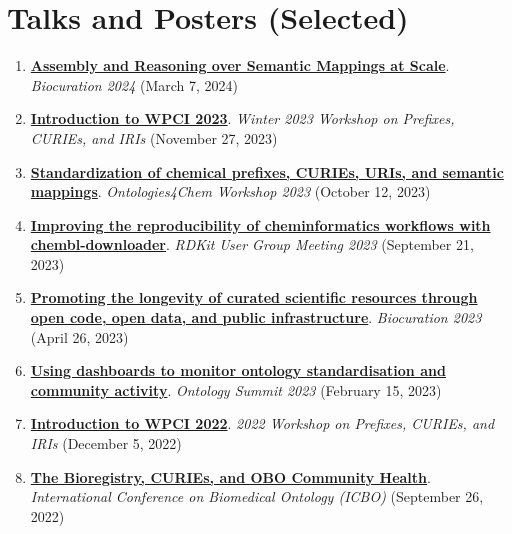 \documentclass[10pt,a4paper,sans]{moderncv} %
\begin{document}
\section{Talks and Posters (Selected)}
\begin{enumerate}
\itemsep0.5em
    \item \textbf{\href{https://bit.ly/biocuration2024-cth}{Assembly and Reasoning over Semantic Mappings at Scale}}. \textit{Biocuration 2024} (March 7, 2024)

    \item \textbf{\href{https://docs.google.com/presentation/d/1SJ-gyoctyX-WLkkULRkUDF25l5CmtZZG3xlWBegDRa8/edit?usp=sharing}{Introduction to WPCI 2023}}. \textit{Winter 2023 Workshop on Prefixes, CURIEs, and IRIs} (November 27, 2023)

    \item \textbf{\href{https://bit.ly/ontologies4chem2023-cth}{Standardization of chemical prefixes, CURIEs, URIs, and semantic mappings}}. \textit{Ontologies4Chem Workshop 2023} (October 12, 2023)

    \item \textbf{\href{https://bit.ly/cth-rdkit-ugm-2023}{Improving the reproducibility of cheminformatics workflows with chembl-downloader}}. \textit{RDKit User Group Meeting 2023} (September 21, 2023)

    \item \textbf{\href{https://docs.google.com/presentation/d/1hEryoMNyp8gwt2pvPy2ErKaw_QPvnWOmzPT0Sn4Yl4s/edit?usp=sharing}{Promoting the longevity of curated scientific resources through open code, open data, and public infrastructure}}. \textit{Biocuration 2023} (April 26, 2023)

    \item \textbf{\href{https://docs.google.com/presentation/d/1oKxBzSCZGuFlIhw6jAXw00xgEGs7KgmaVR54NEdPprw/edit?usp=sharing}{Using dashboards to monitor ontology standardisation and community activity}}. \textit{Ontology Summit 2023} (February 15, 2023)

    \item \textbf{\href{https://docs.google.com/presentation/d/1Vq-tdq_PYSmKydKXEABElgt3oqYs_ridquHDLeUFL1A/edit?usp=sharing}{Introduction to WPCI 2022}}. \textit{2022 Workshop on Prefixes, CURIEs, and IRIs} (December 5, 2022)

    \item \textbf{\href{https://bit.ly/icbo2022-cth}{The Bioregistry, CURIEs, and OBO Community Health}}. \textit{International Conference on Biomedical Ontology (ICBO)} (September 26, 2022)


\end{enumerate}
\end{document}
